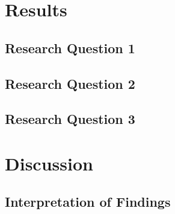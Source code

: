 \documentclass[12pt, a4paper]{article}
\begin{document}
\section{Results}

\subsection{Research Question 1}


\subsection{Research Question 2}


\subsection{Research Question 3}


\section{Discussion}

\subsection{Interpretation of Findings}
\end{document}
